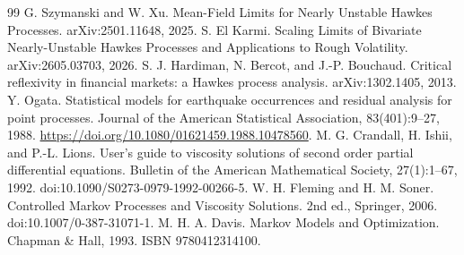 \documentclass[11pt]{article}
\begin{document}
\begin{thebibliography}{99}
 G. Szymanski and W. Xu. Mean-Field Limits for
Nearly Unstable Hawkes Processes. arXiv:2501.11648, 2025.
 S. El Karmi. Scaling Limits of Bivariate
Nearly-Unstable Hawkes Processes and Applications to Rough Volatility.
arXiv:2605.03703, 2026.
 S. J. Hardiman, N. Bercot, and J.-P. Bouchaud.
Critical reflexivity in financial markets: a Hawkes process analysis.
arXiv:1302.1405, 2013.
 Y. Ogata. Statistical models for earthquake occurrences
and residual analysis for point processes. Journal of the American Statistical
Association, 83(401):9--27, 1988.
\url{https://doi.org/10.1080/01621459.1988.10478560}.
 M. G. Crandall, H. Ishii, and P.-L. Lions.
User's guide to viscosity solutions of second order partial differential
equations. Bulletin of the American Mathematical Society, 27(1):1--67, 1992.
doi:10.1090/S0273-0979-1992-00266-5.
 W. H. Fleming and H. M. Soner. Controlled Markov
Processes and Viscosity Solutions. 2nd ed., Springer, 2006.
doi:10.1007/0-387-31071-1.
 M. H. A. Davis. Markov Models and Optimization. Chapman
\& Hall, 1993. ISBN 9780412314100.
\end{thebibliography}
\end{document}
